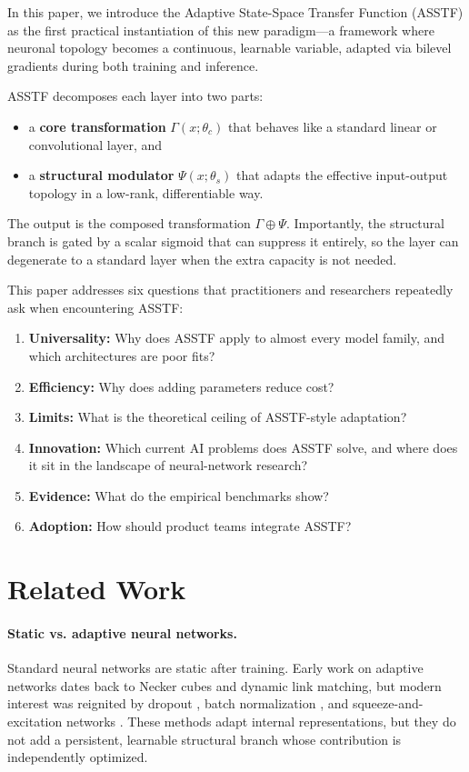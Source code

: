 \documentclass[11pt,a4paper]{article}
\theoremstyle{definition}
\begin{document}
In this paper, we introduce the Adaptive State-Space Transfer Function (ASSTF) as the first practical instantiation of this new paradigm---a framework where neuronal topology becomes a continuous, learnable variable, adapted via bilevel gradients during both training and inference.

ASSTF decomposes each layer into two parts:
\begin{itemize}
    \item a \textbf{core transformation} $\Gamma(x;\theta_c)$ that behaves like a standard linear or convolutional layer, and
    \item a \textbf{structural modulator} $\Psi(x;\theta_s)$ that adapts the effective input-output topology in a low-rank, differentiable way.
\end{itemize}
The output is the composed transformation $\Gamma \oplus \Psi$. Importantly, the structural branch is gated by a scalar sigmoid that can suppress it entirely, so the layer can degenerate to a standard layer when the extra capacity is not needed.

This paper addresses six questions that practitioners and researchers repeatedly ask when encountering ASSTF:
\begin{enumerate}
    \item \textbf{Universality:} Why does ASSTF apply to almost every model family, and which architectures are poor fits?
    \item \textbf{Efficiency:} Why does adding parameters reduce cost?
    \item \textbf{Limits:} What is the theoretical ceiling of ASSTF-style adaptation?
    \item \textbf{Innovation:} Which current AI problems does ASSTF solve, and where does it sit in the landscape of neural-network research?
    \item \textbf{Evidence:} What do the empirical benchmarks show?
    \item \textbf{Adoption:} How should product teams integrate ASSTF?
\end{enumerate}

\section{Related Work}
\label{sec:related}

\paragraph{Static vs.	adaptive neural networks.} Standard neural networks are static after training. Early work on adaptive networks dates back to Necker cubes and dynamic link matching, but modern interest was reignited by dropout \cite{srivastava2014dropout}, batch normalization \cite{ioffe2015batch}, and squeeze-and-excitation networks \cite{hu2018squeeze}. These methods adapt internal representations, but they do not add a persistent, learnable structural branch whose contribution is independently optimized.
\end{document}
